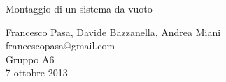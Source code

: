 \begin{center}

	\vspace{0.5cm}
     	{\huge Montaggio di un sistema da vuoto}
	\vspace{0.5cm}

      	{\large Francesco Pasa, Davide Bazzanella, Andrea Miani} \\
      	{francescopasa@gmail.com} \\
		{\large Gruppo A6} \\
	
	\vspace{0.3cm}
      	{\large 7 ottobre 2013}
\end{center}
